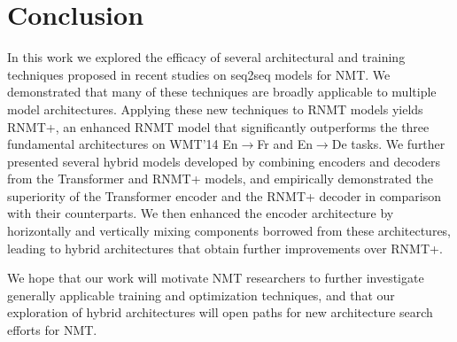 \documentclass[11pt,a4paper]{article}
\begin{document}

\vspace{-5px}
\section{Conclusion}
\label{sec:conclusion}
\vspace{-5px}




In this work we explored the efficacy of several architectural and training
techniques proposed in recent studies on seq2seq
models for NMT. We demonstrated that many of these techniques
are broadly applicable to multiple model architectures.
Applying these new techniques to RNMT models yields RNMT+, an enhanced RNMT
model that
significantly outperforms the three fundamental architectures
on WMT'14 En$\rightarrow$Fr and En$\rightarrow$De tasks.
We further presented several hybrid models developed by combining
encoders and decoders from the Transformer and RNMT+ models, and empirically
demonstrated the superiority of the Transformer encoder and the RNMT+
decoder in comparison with their counterparts. We then enhanced the encoder
architecture by horizontally and vertically mixing components borrowed from
these architectures, leading to hybrid architectures that obtain further improvements
over RNMT+.

We hope that our work will motivate NMT researchers to further
investigate
generally applicable training and optimization techniques,
and that our exploration of hybrid architectures will open
paths for new architecture search efforts for NMT.
\end{document}
